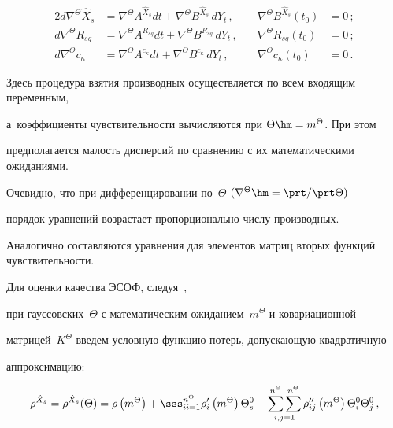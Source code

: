 \begin{alignat*}{2}

d\nabla^\Theta \hat X_s &= \nabla^\Theta A^{\hat X_s} dt + 

\nabla^\Theta B^{\hat X_s}\,dY_t\,,&\quad \nabla^\Theta B^{\hat X_s}\left(t_0\right) &=0\,;\\

d\nabla^\Theta R_{sq} &= \nabla^\Theta A^{R_{sq}} dt + \nabla^\Theta B^{R_{sq}}\,dY_t\,, 

&\quad \nabla^\Theta R_{sq}\left(t_0\right) &=0\,;\\

d\nabla^\Theta c_{\kappa} &= \nabla^\Theta A^{c_\kappa} dt + 

\nabla^\Theta B^{c_\kappa}\,dY_t\,,&\quad \nabla^\Theta c_\kappa\left(t_0\right) &=0\,.


\end{alignat*}

Здесь процедура взятия производных осуществляется по всем входящим переменным, 

а~коэффициенты чувствительности вычисляются при  $\Theta\hm=m^\Theta$. При этом 

предполагается малость дисперсий по сравнению с их математическими ожиданиями. 

Очевидно, что при дифференцировании по~$\Theta$ $(\nabla^\Theta \hm= \prt /\prt\Theta)$

порядок уравнений возрастает пропорционально числу производных. 

Аналогично со\-став\-ля\-ют\-ся уравнения для элементов матриц вторых функций чувствительности.



Для оценки качества ЭСОФ, следуя~\cite{1-s2, 2-s2}, 

при гауссовских~$\Theta$ с математическим ожиданием~$m^\Theta$ и ковариационной 

матрицей~$K^\Theta$ введем условную функцию потерь, допускающую квадратичную 

аппроксимацию:

\begin{equation*}

\rho^{\hat X_s}=\rho^{\hat X_s}(\Theta) =\rho \left(m^\Theta\right) +

\sss_{ii=1}^{n^\Theta} \rho_i' \left(m^\Theta\right)\Theta_s^0+ 

\ss2\limits_{i,j=1} \rho_{ij}'' \left(m^\Theta\right)\Theta_i^0 \Theta_j^0\,,


\end{equation*}

